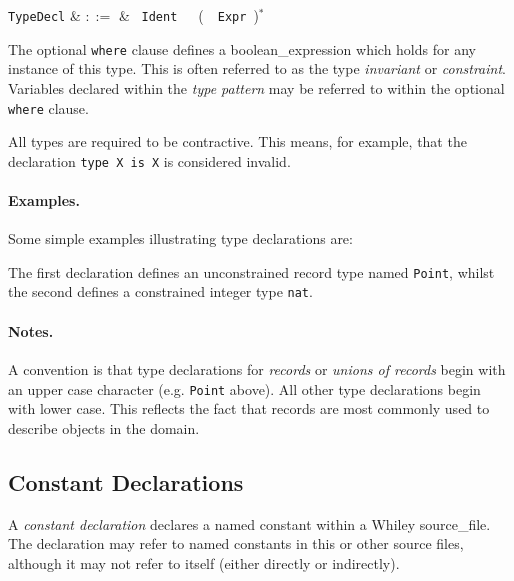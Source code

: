 \begin{syntax}
  \verb+TypeDecl+ & $::=$ & \ \verb+Ident+\ \
  \ \big(\ \ \verb+Expr+\ \big)$^*$\\
\end{syntax}

The optional \lstinline{where} clause defines a \gls{boolean_expression} which holds for any instance of this type.  This is often referred to as the type {\em invariant} or {\em constraint}.  Variables declared within the {\em type pattern} may be referred to within the optional \lstinline{where} clause.  

All types are required to be \gls{contractive}.  This means, for example, that the declaration \lstinline+type X is X+ is considered invalid.

\paragraph{Examples.}  Some simple examples illustrating type
declarations are:



The first declaration defines an unconstrained record type named \lstinline{Point}, whilst the second defines a constrained integer type \lstinline{nat}.

\paragraph{Notes.}  A convention is that type declarations for {\em records} or {\em unions of records} begin with an upper case character (e.g. \lstinline{Point} above).  All other type declarations begin with lower case.  This reflects the fact that records are most commonly used to describe objects in the domain.


\subsection{Constant Declarations}
\label{c_source_files_constant_decl}

A {\em constant declaration} declares a named constant within a Whiley \gls{source_file}.  The declaration may refer to named constants in this or other source files, although it may not refer to itself (either directly or indirectly).

